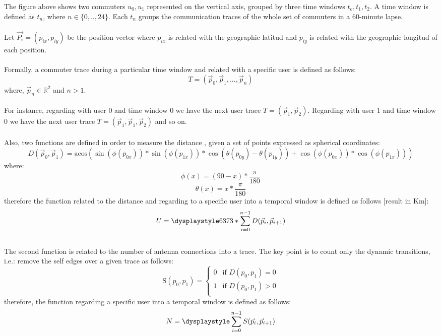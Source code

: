 The figure above shows two commuters ${u_0,u_1}$ represented on the vertical axis, grouped by three time windows $t_o,t_1,t_2$. A time window is defined as $t_n$, where $n \in \{0,..,24\}$. Each $t_n$ groups the communication traces of the whole set of commuters in a 60-minute lapse.
\\
\\
Let $\vec{P_i} = (p_{ix}, p_{iy})$ be the position vector where $p_{ix}$ is related with the geographic latitud and $p_{iy}$ is related with the geographic longitud of each position.
\\
\\
Formally, a commuter trace during a particular time window and related with a specific user is defined as follows:
$$ T = (\vec{p}_0, \vec{p}_1, ..., \vec{p}_n)  $$ where,
$\vec{p}_n \in \mathbb{R}^2$ and $n > 1 $.
\\
\\
For instance, regarding with user $0$ and time window $0$ we have the next user trace $ T = (\vec{p}_1, \vec{p}_2)  $. Regarding with user $1$ and time window $0$ we have the next user trace $ T = (\vec{p}_1, \vec{p}_1, \vec{p}_2)  $ and so on.
\\
\\
Also, two functions are defined in order to measure the distance \citep{distance}, given a set of points expressed as spherical coordinates:
$$D(\vec{p}_0, \vec{p}_1) = \text{acos}( \sin(\phi(p_{0x})) * \sin(\phi(p_{1x})) * \cos(\theta(p_{0y}) - \theta(p_{1y})) + \cos(\phi(p_{0x})) * \cos(\phi(p_{1x})))  $$
where:
$$ \phi(x) = (90 - x) * \frac{\pi}{180}$$
$$ \theta(x) = x  * \frac{\pi}{180}$$
therefore the function related to the distance and regarding to a specific user into a temporal window is defined as follows [result in Km]:
$$U = \dysplaystyle 6373 * \sum_{i=0}^{n-1} D(\vec{p}_i, \vec{p}_{i+1}) $$
\\
The second function is related to the number of antenna connections into a trace. The key point is to count only the dynamic transitions, i.e.: remove the self edges over a given trace as follows:
\\
\begin{equation*}
\text{S}(p_0, p_1) = \left \{
\begin{matrix}
0 & \text{if } D(p_0, p_1) = 0 \\
1 & \text{if } D(p_0, p_1) > 0 \\
\end{matrix} \right.
\end{equation*}
therefore, the function regarding a specific user into a temporal window is defined as follows:
$$N = \dysplaystyle \sum_{i=0}^{n-1} S(\vec{p}_i, \vec{p}_{i+1})$$
